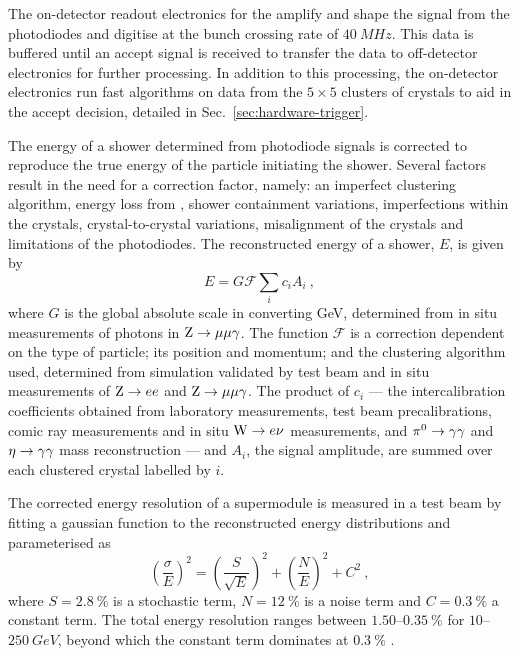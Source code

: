 The on-detector readout electronics for the \ECAL amplify and shape the signal from the photodiodes and digitise at the bunch crossing rate of ${\SI{40}{MHz}}$. This data is buffered until an accept signal is received to transfer the data to off-detector electronics for further processing. In addition to this processing, the on-detector electronics run fast algorithms on data from the ${5\times 5}$ clusters of crystals to aid in the accept decision, detailed in Sec.~\ref{sec:hardware-trigger}.

The energy of a shower determined from photodiode signals is corrected to reproduce the true energy of the particle initiating the shower. Several factors result in the need for a correction factor, namely: an imperfect clustering algorithm, energy loss from \brem, shower containment variations, imperfections within the crystals, crystal-to-crystal variations, misalignment of the crystals and limitations of the photodiodes. The reconstructed energy of a shower, $E$, is given by
%
\begin{equation}
    E = G\mathcal{F}\sum_i c_i A_i\ ,
\end{equation}
%
where $G$ is the global absolute scale in converting GeV, determined from in situ measurements of photons in ${\mathrm{Z}\rightarrow\mu\mu\gamma}$. The function $\mathcal{F}$ is a correction dependent on the type of particle; its position and momentum; and the clustering algorithm used, determined from simulation validated by test beam and in situ measurements of ${\mathrm{Z}\rightarrow ee}$ and ${\mathrm{Z}\rightarrow\mu\mu\gamma}$. The product of $c_i$ --- the intercalibration coefficients obtained from laboratory measurements, test beam precalibrations, comic ray measurements and in situ ${\mathrm{W}\rightarrow e\nu}$ measurements, and ${\pi^{0}\rightarrow\gamma\gamma}$ and ${\eta\rightarrow\gamma\gamma}$ mass reconstruction --- and $A_i$, the signal amplitude, are summed over each clustered crystal labelled by $i$.

The corrected energy resolution of a supermodule is measured in a test beam by fitting a gaussian function to the reconstructed energy distributions and parameterised as
%
\begin{equation}
    \left(\frac{\sigma}{E}\right)^{2} = \left(\frac{S}{\sqrt{E}} \right)^{2}
    + \left( \frac{N}{E} \right)^{2} + C^2\ ,
\end{equation}
%
where $S=\SI{2.8}{\%}$ is a stochastic term, $N=\SI{12}{\%}$ is a noise term and $C=\SI{0.3}{\%}$ a constant term. The total energy resolution ranges between {$1.50$--$\SI{0.35}{\%}$} for {$10$--$\SI{250}{GeV}$}, beyond which the constant term dominates at $\SI{0.3}{\%}$ \cite{Chatrchyan:2008aa}.


